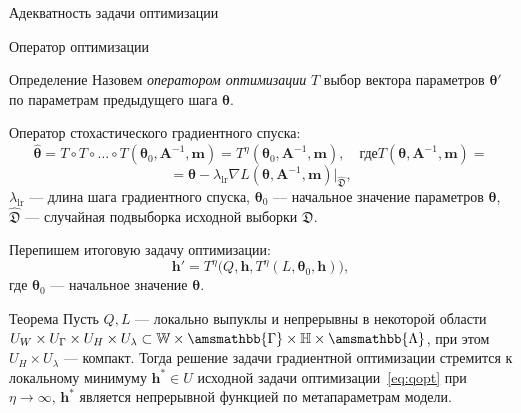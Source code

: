 \documentclass[usenames,dvipsnames,11pt,pdf,utf8,russian,aspectratio=43]{beamer}
\begin{document}
\begin{frame}{Адекватность задачи оптимизации}
\begin{block}{}
\end{block}
\end{frame}





\begin{frame}{Оператор оптимизации}
\footnotesize
\begin{block}{Определение}
Назовем \textit{оператором оптимизации}  $T$ выбор вектора параметров $\boldsymbol{\theta}'$  по параметрам предыдущего шага $\boldsymbol{\theta}$.
\end{block}
Оператор стохастического градиентного спуска:
\[
	 \hat{\boldsymbol{\theta}} = T \circ T \circ \dots \circ T(\boldsymbol{\theta}_0, \mathbf{A}^{-1}, \mathbf{m}) = T^\eta(\boldsymbol{\theta}_0, \mathbf{A}^{-1}, \mathbf{m}), \quad\text{где}	T(\boldsymbol{\theta}, \mathbf{A}^{-1}, \mathbf{m}) =
\]
\[=\boldsymbol{\theta} - \lambda_\text{lr} \nabla L(\boldsymbol{\theta}, \mathbf{A}^{-1}, \mathbf{m})|_{\hat{\mathfrak{D}}}, 
\]
$\lambda_{\text{lr}}$ --- длина шага градиентного спуска, $\boldsymbol{\theta}_0$ --- начальное значение параметров $\boldsymbol{\theta}$, $\hat{\mathfrak{D}}$ --- случайная подвыборка исходной выборки $\mathfrak{D}$.


Перепишем итоговую задачу оптимизации:
\[
	 \mathbf{h}' = T^\eta\bigl(Q, \mathbf{h}, T^\eta(L, \boldsymbol{\theta}_0, \mathbf{h})\bigr),
\]
где $\boldsymbol{\theta}_0$ --- начальное значение $\boldsymbol{\theta}$.

\begin{block}{Теорема}
Пусть $Q,L$ --- локально выпуклы и непрерывны в некоторой области $U_{W} \times U_{\Gamma} \times U_H \times U_\lambda \subset \mathbb{W}\times\amsmathbb{\Gamma}\times\mathbb{H}\times\amsmathbb{\Lambda}$, при  этом $U_H \times U_\lambda$ --- компакт. 
Тогда решение задачи градиентной оптимизации стремится к локальному минимуму  $\mathbf{h}^{*} \in U$ исходной задачи оптимизации~\eqref{eq:qopt} при $\eta \to \infty$,
$\mathbf{h}^{*}$ является непрерывной функцией по метапараметрам модели.
\end{block}

\end{frame}
\end{document}
